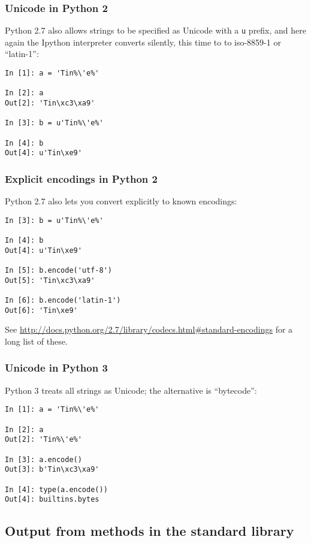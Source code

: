 \documentclass{beamer}
\begin{document}
\begin{frame}[fragile]
  \frametitle{Unicode in Python 2}
  Python 2.7 also allows strings to be specified as Unicode with a \texttt{u} prefix, and here again the Ipython interpreter converts silently, this time to to iso-8859-1 or ``latin-1'':
  \vskip12pt  \begin{lstlisting}[escapechar=\%]
In [1]: a = 'Tin%\'e%'

In [2]: a
Out[2]: 'Tin\xc3\xa9'

In [3]: b = u'Tin%\'e%'

In [4]: b
Out[4]: u'Tin\xe9'
\end{lstlisting}

\end{frame}

\begin{frame}[fragile]
  \frametitle{Explicit encodings in Python 2}
  Python 2.7 also lets you convert explicitly to known encodings:
   \begin{lstlisting}[escapechar=\%]
In [3]: b = u'Tin%\'e%'

In [4]: b
Out[4]: u'Tin\xe9'

In [5]: b.encode('utf-8')
Out[5]: 'Tin\xc3\xa9'

In [6]: b.encode('latin-1')
Out[6]: 'Tin\xe9'
\end{lstlisting}

See \url{http://docs.python.org/2.7/library/codecs.html#standard-encodings} for a long list of these.

\end{frame}



\begin{frame}[fragile]
  \frametitle{Unicode in Python 3}
  Python 3 treats all strings as Unicode; the alternative is ``bytecode'':
   \begin{lstlisting}[escapechar=\%]
In [1]: a = 'Tin%\'e%'

In [2]: a
Out[2]: 'Tin%\'e%'

In [3]: a.encode()
Out[3]: b'Tin\xc3\xa9'

In [4]: type(a.encode())
Out[4]: builtins.bytes
\end{lstlisting}


\end{frame}

\subsection{Output from methods in the standard library}
\end{document}
